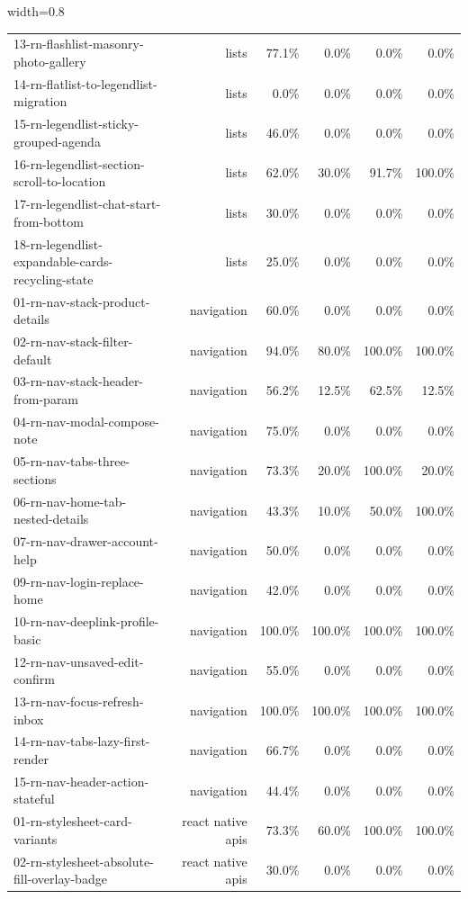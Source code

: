 \begin{table}[htbp]
\begin{adjustbox}{width=0.8\textwidth}
\begin{tabular}{lrrrrr}
13-rn-flashlist-masonry-photo-gallery & lists & 77.1\% & 0.0\% & 0.0\% & 0.0\% \\
14-rn-flatlist-to-legendlist-migration & lists & 0.0\% & 0.0\% & 0.0\% & 0.0\% \\
15-rn-legendlist-sticky-grouped-agenda & lists & 46.0\% & 0.0\% & 0.0\% & 0.0\% \\
16-rn-legendlist-section-scroll-to-location & lists & 62.0\% & 30.0\% & 91.7\% & 100.0\% \\
17-rn-legendlist-chat-start-from-bottom & lists & 30.0\% & 0.0\% & 0.0\% & 0.0\% \\
18-rn-legendlist-expandable-cards-recycling-state & lists & 25.0\% & 0.0\% & 0.0\% & 0.0\% \\
01-rn-nav-stack-product-details & navigation & 60.0\% & 0.0\% & 0.0\% & 0.0\% \\
02-rn-nav-stack-filter-default & navigation & 94.0\% & 80.0\% & 100.0\% & 100.0\% \\
03-rn-nav-stack-header-from-param & navigation & 56.2\% & 12.5\% & 62.5\% & 12.5\% \\
04-rn-nav-modal-compose-note & navigation & 75.0\% & 0.0\% & 0.0\% & 0.0\% \\
05-rn-nav-tabs-three-sections & navigation & 73.3\% & 20.0\% & 100.0\% & 20.0\% \\
06-rn-nav-home-tab-nested-details & navigation & 43.3\% & 10.0\% & 50.0\% & 100.0\% \\
07-rn-nav-drawer-account-help & navigation & 50.0\% & 0.0\% & 0.0\% & 0.0\% \\
09-rn-nav-login-replace-home & navigation & 42.0\% & 0.0\% & 0.0\% & 0.0\% \\
10-rn-nav-deeplink-profile-basic & navigation & 100.0\% & 100.0\% & 100.0\% & 100.0\% \\
12-rn-nav-unsaved-edit-confirm & navigation & 55.0\% & 0.0\% & 0.0\% & 0.0\% \\
13-rn-nav-focus-refresh-inbox & navigation & 100.0\% & 100.0\% & 100.0\% & 100.0\% \\
14-rn-nav-tabs-lazy-first-render & navigation & 66.7\% & 0.0\% & 0.0\% & 0.0\% \\
15-rn-nav-header-action-stateful & navigation & 44.4\% & 0.0\% & 0.0\% & 0.0\% \\
01-rn-stylesheet-card-variants & react native apis & 73.3\% & 60.0\% & 100.0\% & 100.0\% \\
02-rn-stylesheet-absolute-fill-overlay-badge & react native apis & 30.0\% & 0.0\% & 0.0\% & 0.0\% \\

\end{tabular}
\end{adjustbox}
\end{table}
